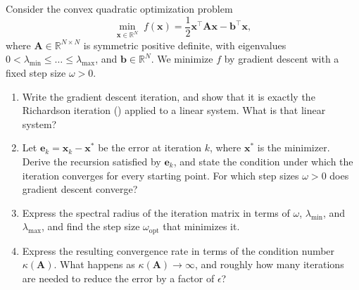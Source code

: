 \begin{exercise} %
    
    Consider the convex quadratic optimization problem
    \[
        \min_{\mathbf{x} \in \mathbb{R}^N} \; f(\mathbf{x}) = \frac{1}{2} \mathbf{x}^\top \mathbf{A} \mathbf{x} - \mathbf{b}^\top \mathbf{x},
    \]
    where $\mathbf{A} \in \mathbb{R}^{N \times N}$ is symmetric positive definite, with eigenvalues $0 < \lambda_{\min} \le \dots \le \lambda_{\max}$, and $\mathbf{b} \in \mathbb{R}^N$. We minimize $f$ by gradient descent with a fixed step size $\omega > 0$.
    \begin{enumerate}[label=(\alph*)]
        \item Write the gradient descent iteration, and show that it is exactly the Richardson iteration () applied to a linear system. What is that linear system?
        \item Let $\mathbf{e}_k = \mathbf{x}_k - \mathbf{x}^*$ be the error at iteration $k$, where $\mathbf{x}^*$ is the minimizer. Derive the recursion satisfied by $\mathbf{e}_k$, and state the condition under which the iteration converges for every starting point. For which step sizes $\omega > 0$ does gradient descent converge?
        \item Express the spectral radius of the iteration matrix in terms of $\omega$, $\lambda_{\min}$, and $\lambda_{\max}$, and find the step size $\omega_{\text{opt}}$ that minimizes it.
        \item Express the resulting convergence rate in terms of the condition number $\kappa(\mathbf{A})$. What happens as $\kappa(\mathbf{A}) \to \infty$, and roughly how many iterations are needed to reduce the error by a factor of $\epsilon$?
    \end{enumerate}
    
\end{exercise}

